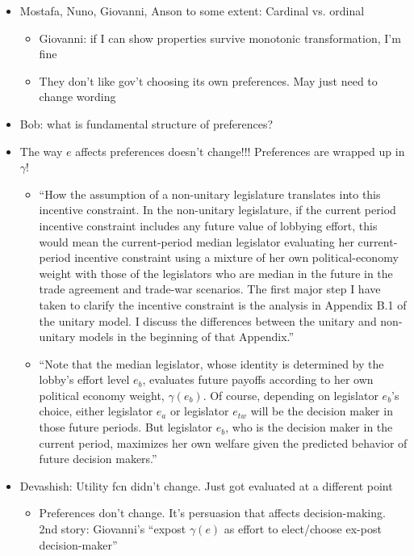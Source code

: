 \documentclass[12pt]{article}
\newcommand{\ga}{\gamma}
\begin{document}
\begin{itemize}
\begin{itemize}
		
				\end{itemize}
			\item Mostafa, Nuno, Giovanni, Anson to some extent: Cardinal vs. ordinal
				\begin{itemize}
					\item Giovanni: if I can show properties survive  monotonic transformation, I'm fine
					\item They don't like gov't choosing its own preferences. May just need to change wording
				\end{itemize}
			\item Bob: what is fundamental structure of preferences?
			\item The way $e$ affects preferences doesn't change!!! Preferences are wrapped up in $\ga$!
				\begin{itemize}
					\item ``How the assumption of a non-unitary legislature translates into this incentive constraint. In the non-unitary legislature, if the current period incentive constraint includes any future value of lobbying effort, this would mean the current-period median legislator evaluating her current-period incentive constraint using a mixture of her own political-economy weight with those of the legislators who are median in the future in the trade agreement and trade-war scenarios. The first major step I have taken to clarify the incentive constraint is the analysis in Appendix B.1 of the unitary model. I discuss the differences between the unitary and non-unitary models in the beginning of that Appendix.''
					\item ``Note that the median legislator, whose identity is determined by the lobby's effort level $e_b$, evaluates future payoffs according to her own political economy weight, $\ga(e_b)$. Of course, depending on legislator $e_b$'s choice, either legislator $e_a$ or legislator $e_{tw}$ will be the decision maker in those future periods. But legislator $e_b$, who is the decision maker in the current period, maximizes her own welfare given the predicted behavior of future decision makers.''

				\end{itemize}
			\item Devashish: Utility fcn didn't change. Just got evaluated at a different point
				\begin{itemize}
					\item Preferences don't change. It's persuasion that affects decision-making. 2nd story: Giovanni's ``expost $\ga(e)$ as effort to elect/choose ex-post decision-maker''
				\end{itemize}
		\end{itemize}
		
\end{document}
